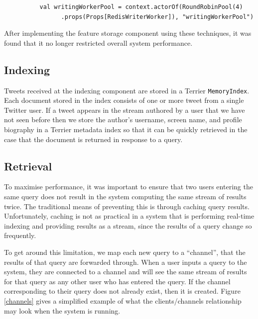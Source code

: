 \documentclass{l4proj}
\newcommand{\code}[1]{\texttt{#1}}
\begin{document}
        \begin{lstlisting}
          val writingWorkerPool = context.actorOf(RoundRobinPool(4)
                .props(Props[RedisWriterWorker]), "writingWorkerPool")
        \end{lstlisting}

        
        After implementing the feature storage component using these techniques, it was found that it no longer restricted overall system performance.

        \subsection{Indexing}
        Tweets received at the indexing component are stored in a Terrier \code{MemoryIndex}. Each document stored in the index consists of one or more tweet from a single Twitter user. If a tweet appears in the stream authored by a user that we have not seen before then we store the author's username, screen name, and profile biography in a Terrier metadata index so that it can be quickly retrieved in the case that the document is returned in response to a query.        
        
        \subsection{Retrieval}
        
        To maximise performance, it was important to ensure that two users entering the same query does not result in the system computing the same stream of results twice. The traditional means of preventing this is through caching query results. Unfortunately, caching is not as practical in a system that is performing real-time indexing and providing results as a stream, since the results of a query change so frequently.
        
        To get around this limitation, we map each new query to a ``channel'', that the results of that query are forwarded through. When a user inputs a query to the system, they are connected to a channel and will see the same stream of results for that query as any other user who has entered the query. If the channel corresponding to their query does not already exist, then it is created. Figure \ref{channels} gives a simplified example of what the clients/channels relationship may look when the system is running.
        
\end{document}
